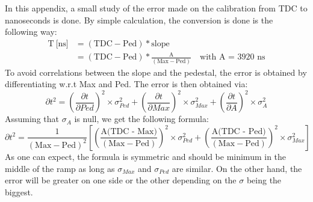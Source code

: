 \documentclass[twoside,a4paper,11pt]{article}
\begin{document}
\begin{appendix}
In this appendix, a small study of the error made on the calibration from TDC to nanoseconds is done. By simple calculation, the conversion is done is the following way:
\begin{equation*}
\begin{split}
\text{T} \: \text{[ns]} & = ( \text{TDC} - \text{Ped} ) * \text{slope} \\
& = ( \text{TDC} - \text{Ped} ) * \frac{\text{A}}{(\text{Max} - \text{Ped})} \quad \text{with A = 3920 ns}
\end{split}
\end{equation*}
To avoid correlations between the slope and the pedestal, the error is obtained by differentiating w.r.t Max and Ped. The error is then obtained via:
\begin{equation*}
\partial t^2 = \left(\frac{\partial t}{\partial Ped}\right)^2 \times \sigma_{Ped}^2 + \left(\frac{\partial t}{\partial Max}\right)^2 \times \sigma_{Max}^2 + \left(\frac{\partial t}{\partial A}\right)^2 \times \sigma_{A}^2
\end{equation*}
Assuming that $\sigma_{A}$ is null, we get the following formula:
\begin{equation*}
\partial t^2 = \frac{1}{(\text{Max} - \text{Ped})^2} \left[ \left( \frac{\text{A(TDC - Max)}}{(\text{Max} - \text{Ped})} \right)^2 \times \sigma_{Ped}^2 + \left( \frac{\text{A(TDC - Ped)}}{(\text{Max} - \text{Ped})} \right)^2 \times \sigma_{Max}^2 \right]
\end{equation*}
As one can expect, the formula is symmetric and should be minimum in the middle of the ramp as long as $\sigma_{Max}$ and $\sigma_{Ped}$ are similar. On the other hand, the error will be greater on one side or the other depending on the $\sigma$ being the biggest. 
\begin{figure}[htbp]
	\hfill

\end{figure}
\end{appendix}
\end{document}
